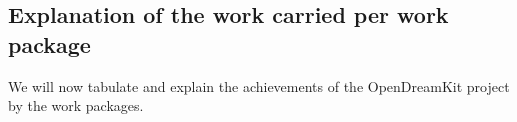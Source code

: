 \subsection{Explanation of the work carried per work package}\label{sec:achievements}
We will now tabulate and explain the achievements of the OpenDreamKit project by the work packages.

\newpage
\newpage
\newpage
\newpage
\newpage



